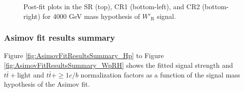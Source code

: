 \begin{figure}[H]
  \centering
  \par
  \caption{Post-fit plots in the SR (top), CR1 (bottom-left), and CR2 (bottom-right) for 4000 GeV mass hypothesis of $W'_{\text{R}}$ signal.}
  \label{fig:Postfit_WpRH4000_Asimov}
\end{figure}

\subsubsection{Asimov fit results summary}
\label{subsec:AsimovFitResultSummary}
Figure \ref{fig:AsimovFitResultsSummary_Hp} to Figure \ref{fig:AsimovFitResultsSummary_WpRH} shows the fitted signal strength and $t\bar{t}+\text{light}$ and $t\bar{t}+{\geq}1c/b$ normalization factors as a function of the signal mass hypothesis of the Asimov fit.

